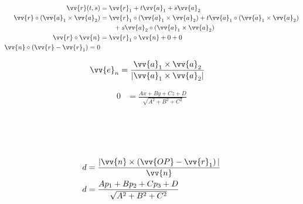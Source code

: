 \begin{boxleft}
\end{boxleft}\begin{boxrightshaded}
\begin{align} 
\vv{r}(t,s) &=\vv{r}_1+t\vv{a}_1+s\vv{a}_2\\
\vv{r}\circ(\vv{a}_1\times\vv{a}_2)&=\vv{r}_1\circ(\vv{a}_1\times\vv{a}_2)+t\vv{a}_1\circ(\vv{a}_1\times\vv{a}_2)\\
&\qquad +s\vv{a}_2\circ(\vv{a}_1\times\vv{a}_2)\\
\vv{r}\circ\vv{n}&=\vv{r}_1\circ\vv{n}+0+0\\
\vv{n}\circ\left(\vv{r}-\vv{r}_1\right)=0
\end{align}\end{boxrightshaded}

\begin{boxleft}
\end{boxleft}\begin{boxrightshaded}
\begin{align} 
\vv{e}_n&=\frac{\vv{a}_1\times\vv{a}_2}{|\vv{a}_1\times\vv{a}_2|}
\end{align}\end{boxrightshaded}

\begin{boxleft}
\end{boxleft}\begin{boxrightshaded}
\begin{align} 
0&=\frac{Ax+By+Cz+D}{\sqrt{A^2+B^2+C^2}}
\end{align}\end{boxrightshaded}


\begin{boxleft}
\\
\\
\\
\end{boxleft}\begin{boxrightshaded}
\begin{align} 
d&=\frac{|\vv{n}\times\left(\vv{OP}-\vv{r}_1\right)|}{\vv{n}}\\
d&=\frac{Ap_1+Bp_2+Cp_3+D}{\sqrt{A^2+B^2+C^2}}
\end{align}\end{boxrightshaded}


